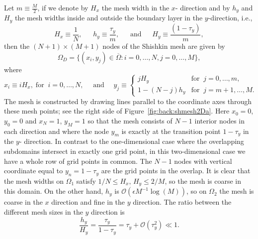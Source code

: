 Let $m\equiv \frac{M}{2}$, if we denote by $H_x$ the mesh width in the $x$-
direction and by $h_y$ and $H_y$ the mesh widths inside and outside the
boundary layer in the $y$-direction, i.e.,
%
\begin{equation}\label{eq:back:Hh2D}
H_x\equiv\frac{ 1}{N},
\;\;\quad
h_y\equiv\frac{\tau_y}{m},
\;\;\quad\mbox{and}\;\;\quad
H_y\equiv\frac{( 1-\tau_y)}{m},
 \end{equation}
%
then the $(N+1)\times(M+1)$ nodes of the Shishkin mesh are given by
\[
\Omega_D=\{(x_i,y_j)\in\overline{\Omega}:i=0,\ldots,N, j=0,\ldots,M\},
\]
where
%
\begin{equation}\label{eq:back:shishmeshnodes}
x_i\equiv iH_x,\;\mbox{for}\;\; i=0,\ldots,N,
\quad \mbox{ and } \quad
y_j\equiv
\begin{cases} jH_y &\mbox{for}\;\; j=0,\ldots,m, \\
1-(N-j)h_y &\mbox{for}\;\; j=m+1,\ldots,M. \end{cases}
\end{equation}
%
%
The mesh is constructed by drawing lines parallel to the coordinate axes
through these mesh points; see the right side of
Figure~\ref{fig:back:shmesh2Da}. Here $x_0=0$, $y_0=0$ and $x_N=1$, $y_M=1$
so that the mesh consists of $N-1$ interior nodes in each direction and where
the node $y_m$ is exactly at the transition point $1-\tau_y$ in the $y$-
direction. In contrast to the one-dimensional case where the overlapping
subdomains intersect in exactly one grid point, in this two-dimensional case
we have a whole row of grid points in common. The $N-1$  nodes with vertical
coordinate equal to $y_n=1-\tau_y$ are the grid points in the overlap. It is
clear that the mesh widths on $\Omega_{1}$ satisfy
$1/N\leq H_x,\, H_y\leq 2/M$, so the mesh is coarse in this domain. On the
other hand, $h_y$ is $\mathscr{O}(\epsilon M^{-1}\log(M))$, so on $\Omega_2$
the mesh is coarse in the $x$ direction and fine in the $y$ direction. The
ratio between the different mesh sizes in the $y$ direction is
%
\[\frac{h_y}{H_y}=\frac{\tau_y}{1-\tau_y}=\tau_y+\mathscr{O}(\tau_y^2) \ll 1.\]
%


